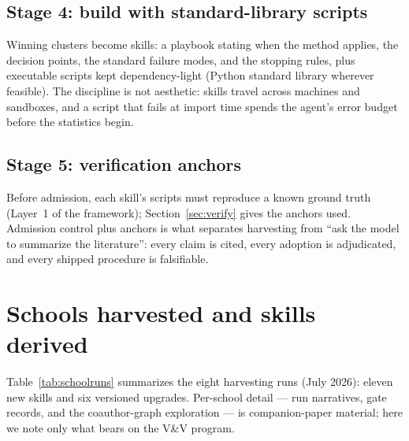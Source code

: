 \documentclass[11pt,a4paper]{article}
\begin{document}
\subsection{Stage 4: build with standard-library scripts}

Winning clusters become skills: a playbook stating when the method applies,
the decision points, the standard failure modes, and the stopping rules,
plus executable scripts kept dependency-light (Python standard library
wherever feasible). The discipline is not aesthetic: skills travel across
machines and sandboxes, and a script that fails at import time spends the
agent's error budget before the statistics begin.

\subsection{Stage 5: verification anchors}

Before admission, each skill's scripts must reproduce a known ground truth
(Layer~1 of the framework); Section~\ref{sec:verify} gives the anchors
used. Admission control plus anchors is what separates harvesting from
``ask the model to summarize the literature'': every claim is cited, every
adoption is adjudicated, and every shipped procedure is falsifiable.

\section{Schools harvested and skills derived}\label{sec:schools}

Table~\ref{tab:schoolruns} summarizes the eight harvesting runs (July
2026): eleven new skills and six versioned upgrades. Per-school detail ---
run narratives, gate records, and the coauthor-graph exploration --- is
companion-paper material; here we note only what bears on the V\&V
program.
\end{document}
